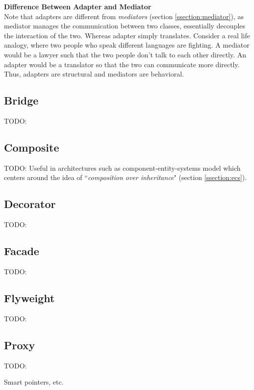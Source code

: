 \begin{multicols}{2}
\textbf{Difference Between Adapter and Mediator}\bs
\\

Note that adapters are different from \textit{mediators} (section \ref{ssection:mediator}), as mediator manages the communication between two classes, essentially decouples the interaction of the two. Whereas adapter simply translates.
\bs
Consider a real life analogy, where two people who speak different languages are fighting. A mediator would be a lawyer such that the two people don't talk to each other directly. An adapter would be a translator so that the two can communicate more directly. Thus, adapters are structural and mediators are behavioral.

\subsection{Bridge}
TODO:

\subsection{Composite}
TODO:
Useful in architectures such as component-entity-systems model which centers around the idea of ``\textit{composition over inheritance}" (section \ref{ssection:ecs}).


\subsection{Decorator}
TODO:

\subsection{Facade}
TODO:

\subsection{Flyweight}
TODO:

\subsection{Proxy}
TODO:



Smart pointers, etc.


\iftwocolumns
\end{multicols}
\fi